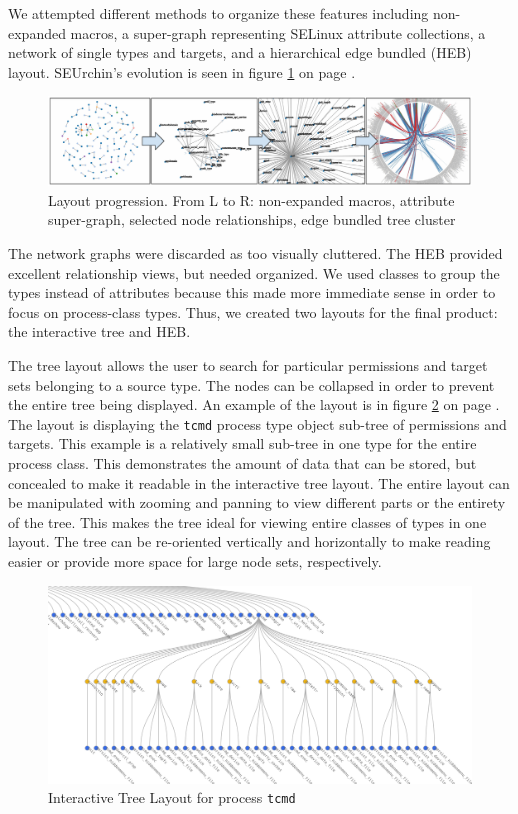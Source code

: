 \documentclass[conference]{IEEEtran}
\begin{document}
We attempted different methods to organize these features including non-expanded macros, a super-graph representing SELinux attribute collections, a network of single types and targets, and a hierarchical edge bundled (HEB) layout\cite{holten2006hierarchical}. SEUrchin's evolution is seen in figure \ref{fig:progress} on page \pageref{fig:progress}.

\begin{figure}
\includegraphics[max width={\textwidth}, frame]{progress-resize.pdf}
\caption{Layout progression. From L to R: non-expanded macros, attribute super-graph, selected node relationships, edge bundled tree cluster}
\label{fig:progress}
\end{figure}

The network graphs were discarded as too visually cluttered. The HEB provided excellent relationship views, but needed organized. We used classes to group the types instead of attributes because this made more immediate sense in order to focus on process-class types. Thus, we created two layouts for the final product: the interactive tree and HEB.

The tree layout allows the user to search for particular permissions and target sets belonging to a source type. The nodes can be collapsed in order to prevent the entire tree being displayed. An example of the layout is in figure \ref{fig:tree} on page \pageref{fig:tree}. The layout is displaying the \texttt{tcmd} process type object sub-tree of permissions and targets. This example is a relatively small sub-tree in one type for the entire process class. This demonstrates the amount of data that can be stored, but concealed to make it readable in the interactive tree layout. The entire layout can be manipulated with zooming and panning to view different parts or the entirety of the tree. This makes the tree ideal for viewing entire classes of types in one layout. The tree can be re-oriented vertically and horizontally to make reading easier or provide more space for large node sets, respectively.

\begin{figure}
\includegraphics[max width={\columnwidth}, frame]{g5.png}
\caption{Interactive Tree Layout for process \texttt{tcmd}}
\label{fig:tree}
\end{figure}
\end{document}
